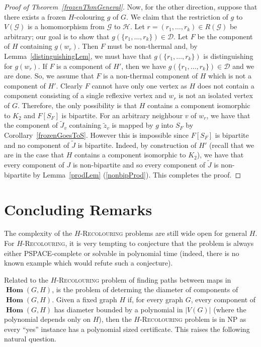 \documentclass[11 pt]{amsart}
\theoremstyle{definition}
\theoremstyle{case}
\numberwithin{equation}{section}
\newcommand\Hrec[1]{\textsc{$#1$-Recolouring}}
\newcommand{\Hom}{\operatorname{Hom}}
\newcommand{\bHom}{\operatorname{\mathbf{Hom}}}
\begin{document}
\begin{proof}[Proof of Theorem~\ref{frozenThmGeneral}]
Now, for the other direction, suppose that there exists a frozen $H$-colouring $g$ of $G$. We claim that the restriction of $g$ to $V(\mathcal{G})$ is a homomorphism from $\mathcal{G}$ to $\mathcal{H}$. Let $r=(r_1,\dots,r_k)\in R(\mathcal{G})$ be arbitrary; our goal is to show that $g(\{r_1,\dots,r_k\})\in \mathcal{D}$. Let $F$ be the component of $H$ containing $g(w_r)$. Then $F$ must be non-thermal and, by Lemma~\ref{distinguishingLem}, we must have that $g(\{r_1,\dots,r_k\})$ is distinguishing for $g(w_r)$. If $F$ is a component of $H'$, then we have $g(\{r_1,\dots,r_k\})\in\mathcal{D}$ and we are done. So, we assume that $F$ is a non-thermal component of $H$ which is not a component of $H'$. Clearly $F$ cannot have only one vertex as $H$ does not contain a component consisting of a single reflexive vertex and $w_r$ is not an isolated vertex of $G$. Therefore, the only possibility is that $H$ contains a component isomorphic to $K_2$ and $F[S_F]$ is bipartite. For an arbitrary neighbour $v$ of $w_r$, we have that the component of $\tilde{J}_v$ containing $\tilde{z}_v$ is mapped by $g$ into $S_F$ by Corollary~\ref{frozenGoesToS}. However this is impossible since  $F[S_F]$ is bipartite and no component of $\tilde{J}$ is bipartite. Indeed, by construction of $H'$ (recall that we are in the case that $H$ contains a component isomorphic to $K_2$), we have that every component of $J$ is non-bipartite  and so every component of $\tilde{J}$  is non-bipartite by Lemma~\ref{prodLem} (\ref{nonbipProd}). This completes the proof.
\end{proof}


\section{Concluding Remarks}
\label{conclusion}

The complexity of the \Hrec{H} problems are still wide open for general $H$. For \Hrec{H}, it is very tempting to conjecture that the problem is always either PSPACE-complete or solvable in polynomial time (indeed, there is no known example which would refute such a conjecture). 

Related to the \Hrec{H} problem of finding paths between maps in $\bHom(G,H)$, is the problem of
determing the diameter of components of $\bHom(G,H)$.
Given a fixed graph $H$ if, for every graph $G$,  every component of $\bHom(G,H)$ has diameter bounded by a polynomial in $|V(G)|$ (where the polynomial depends only on $H$), then the \Hrec{H} problem is in NP as every ``yes'' instance has a polynomial sized certificate. This raises the following natural question. 
\end{document}
